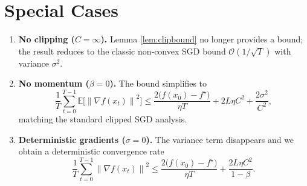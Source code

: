 \documentclass{article}
\newcommand{\EE}{\mathbb{E}}
\newcommand{\norm}[1]{\left\|#1\right\|}
\newcommand{\grad}{\nabla}
\begin{document}
\section*{Special Cases}
\begin{enumerate}[label=\alph*)]
    \item \textbf{No clipping ($C=\infty$).} Lemma \ref{lem:clipbound} no longer provides a bound; the result reduces to the classic non‑convex SGD bound $\mathcal{O}(1/\sqrt{T})$ with variance $\sigma^2$.
    \item \textbf{No momentum ($\beta=0$).} The bound simplifies to
    \[
        \frac{1}{T}\sum_{t=0}^{T-1}\EE\!\bigl[\norm{\grad f(x_t)}^2\bigr]
        \le \frac{2\bigl(f(x_0)-f^\star\bigr)}{\eta T}
          +2L\eta C^2
          +\frac{2\sigma^2}{C^2},
    \]
    matching the standard clipped SGD analysis.
    \item \textbf{Deterministic gradients ($\sigma=0$).} The variance term disappears and we obtain a deterministic convergence rate
    \[
        \frac{1}{T}\sum_{t=0}^{T-1}\norm{\grad f(x_t)}^2
        \le \frac{2\bigl(f(x_0)-f^\star\bigr)}{\eta T}
          +\frac{2L\eta C^2}{1-\beta}.
    \]
\end{enumerate}
\end{document}
